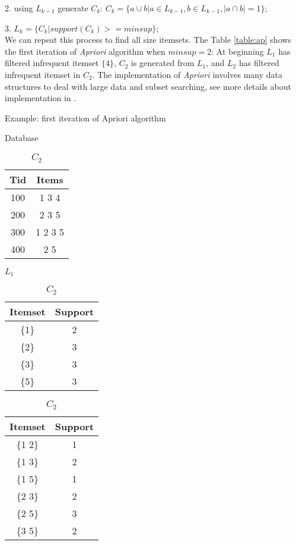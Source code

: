 \documentclass{article}
\begin{document}
2. using $L_{k-1}$ generate $C_k$: $C_k = \{a \cup b | a \in L_{k-1}, b \in L_{k-1}, |a \cap b| = 1\}$;

3. $L_k = \{C_k | support(C_k) >= minsup\}$;\\
We can repeat this process to find all size itemsets. The Table \ref{table:ap} shows the first iteration of \textit{Apriori} algorithm when $minsup=2$: At beginning $L_1$ has filtered infrequent itemset $\{4\}$, $C_2$ is generated from $L_1$, and $L_2$ has filtered infrequent itemset in $C_2$.
The implementation of \textit{Apriori} involves many data structures to deal with large data and subset searching, see more details about implementation in \cite{agrawal1994fast}.

\begin{table}[!htb]
    \caption{Example: first iteration of Apriori algorithm}
    \begin{subtable}{.5\linewidth}
        \caption{Database}
        \begin{tabular}{|c|c|}
            Tid & Items\\
            \hline
            100 & 1 3 4\\
            200 & 2 3 5\\
            300 & 1 2 3 5\\
            400 & 2 5\\
        \end{tabular}
    \end{subtable}
    
    \begin{subtable}{.5\linewidth}
        \caption{$L_1$}
        \begin{tabular}{|c|c|}
            Itemset & Support\\
            \hline
            \{1\} & 2 \\
            \{2\} & 3 \\
            \{3\} & 3 \\
            \{5\} & 3 \\
        \end{tabular}
    \end{subtable}
    
    \begin{subtable}{.5\linewidth}
        \caption{$C_2$}
        \begin{tabular}{|c|c|}
            Itemset &  Support\\
            \hline
            \{1 2\} & 1 \\
            \{1 3\} & 2 \\
            \{1 5\} & 1 \\
            \{2 3\} & 2 \\
            \{2 5\} & 3 \\
            \{3 5\} & 2 \\
        \end{tabular}
    \end{subtable}
    

\end{table}
\end{document}
